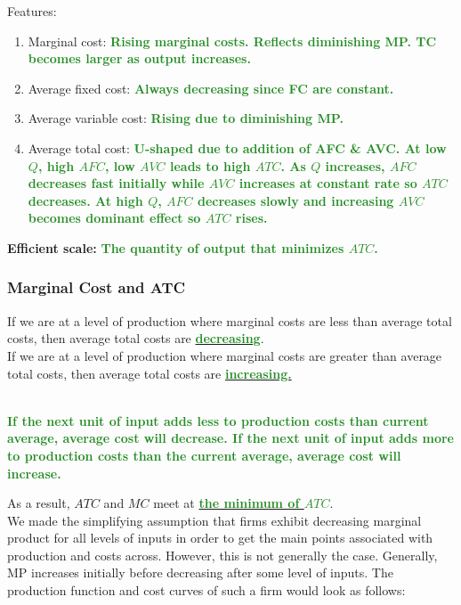 \documentclass[11pt]{article}\usepackage[]{graphicx}\usepackage[]{color}
\theoremstyle{definition}
\newcommand{\blank}[1]{}
\newcommand{\ddp}[1]{{\textbf{\textcolor{ForestGreen}{#1}}}}
\newcommand{\dd}[1]{{\underline{\textbf{\textcolor{ForestGreen}{#1}}}}}
\newcommand{\defn}[1]{\textbf{#1}}
\begin{document}
	Features:
	\begin{enumerate}
		\item Marginal cost: \ddp{Rising marginal costs. Reflects diminishing MP. TC becomes larger as output increases.}
		\blank{}
		\item Average fixed cost: \ddp{Always decreasing since FC are constant.}
		\blank{}
		\item Average variable cost: \ddp{Rising due to diminishing MP.}
		\blank{}
		\item Average total cost: \ddp{U-shaped due to addition of AFC \& AVC. At low $Q$, high $AFC$, low $AVC$ leads to high $ATC$. As $Q$ increases, $AFC$ decreases fast initially while $AVC$ increases at constant rate so $ATC$ decreases. At high $Q$, $AFC$ decreases slowly and increasing $AVC$ becomes dominant effect so $ATC$ rises.}
		\blank{}
	\end{enumerate}
	
	\defn{Efficient scale:} \ddp{The quantity of output that minimizes $ATC$.}
	
	\subsubsection*{Marginal Cost and ATC}
	
	If we are at a level of production where marginal costs are less than average total costs, then average total costs are \dd{decreasing}.
	\\
	
	If we are at a level of production where marginal costs are greater than average total costs, then average total costs are \dd{increasing.}
	
	\blank{}

	\ddp{\\If the next unit of input adds less to production costs than current average, average cost will decrease. If the next unit of input adds more to production costs than the current average, average cost will increase.\\}
	
	As a result, $ATC$ and $MC$ meet at \dd{the minimum of $ATC$}.
	\\
	
	We made the simplifying assumption that firms exhibit decreasing marginal product for all levels of inputs in order to get the main points associated with production and costs across. However, this is not generally the case. Generally, MP increases initially before decreasing after some level of inputs. The production function and cost curves of such a firm would look as follows:
	
\end{document}
